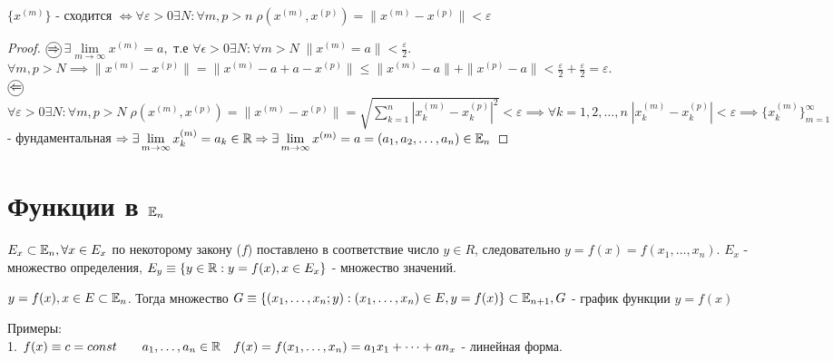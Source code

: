 \documentclass[../main.tex]{subfiles}
\begin{document}
\begin{theorem}
    $\{x^{(m)}\}$ - сходится $\Leftrightarrow \forall \varepsilon>0 \exists N: \forall m,p> n \; \rho(x^{(m)},x^{(p)})= \| x^{(m)}-x^{(p)}\| <\varepsilon$
\end{theorem}
\begin{proof}
    $\tcircle{$\implies$}$ $\exists \lim\limits_{ m\to \infty}x^{(m)}=a ,  $ т.е $\forall \epsilon>0 \exists N: \forall m> N \; \| x^{(m)}=a \| <\frac{\varepsilon}{2}$. 
    \\$ \forall m,p > N \implies \| x^{(m)}-x^{(p)}\| = \| x^{(m)}-a + a - x^{(p)}\| \leqslant \| x^{(m)}-a \| + \| x^{(p)}-a\| <\frac{\varepsilon}{2} + \frac{\varepsilon}{2}=\varepsilon$. 
    \\$\tcircle{$\impliedby$}$ $\forall \varepsilon>0 \exists N: \forall m,p > N \; \rho(x^{(m)},x^{(p)})=\| x^{(m)}-x^{(p)}\| =\sqrt{\sum_{k=1}^{n } \left|x_{k}^{(m)}-x_{k}^{(p)}\right|^{2}}<\varepsilon\implies \forall k=1,2,\dots,n \; |x_{k}^{(m)}-x_{k}^{(p)}|<\varepsilon\implies  \{ x_{k}^{(m)}\}_{m=1}^{\infty} $ - фундаментальная $\implies \exists \lim\limits_{m\to \infty}x_{k}^{(m)}=a_{k}\in\R\implies \exists \lim\limits_{m \to \infty}  x^{(m)}=a=(a_{1},a_{2},\dots,a_{n})\in \E_{n}$
\end{proof}


\section{Функции в $\mathbb{E}_{n}$} 
\begin{definition}
    $E_{x}\subset \mathbb{E}_{n}, \forall x \in E_{x}$ по некоторому закону ($f$) поставлено в соответствие число $y\in R$, следовательно $y= f(x)=f(x_{1},\dots,x_{n})$. $E_{x}$ - множество определения, $E_{y} \equiv \{y\in \mathbb{R}: y = f(x), x\in E_{x}\}$ - множество значений.
\end{definition}
\begin{definition}
    $y = f(x), x \in E \subset \mathbb{E}_{n}$. Тогда множество $G \equiv\{(x_{1},\dots,x_{n};y):(x_{1},\dots,x_{n})\in E, y=f(x)\}\subset \mathbb{E}_{n+1}, G$ - график функции $y=f(x)$  
\end{definition}

Примеры: 
\\1. $f(x)\equiv c = const\qquad a_{1},\dots,a_{n}\in \mathbb{R} \quad f(x)=f(x_{1},\dots,x_{n})=a_{1}x_{1}+\dots+an_{x}$ - линейная форма. 
\end{document}
